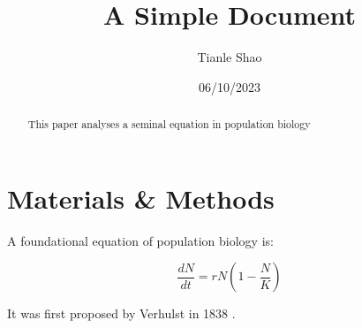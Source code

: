 \documentclass[12pt]{article}
\title{A Simple Document}
\author{Tianle Shao}
\date{06/10/2023}
\begin{document}
    \maketitle

    \begin{abstract}
        This paper analyses a seminal equation in population biology
    \end{abstract}

    \section{Materials \& Methods}

    A foundational equation of population biology is:

    \begin{equation}
        \frac{dN}{dt} = r N (1 - \frac{N}{K})
    \end{equation}

    It was first proposed by Verhulst in 1838 \cite{verhulst1838notice}.

    

    
\end{document}
